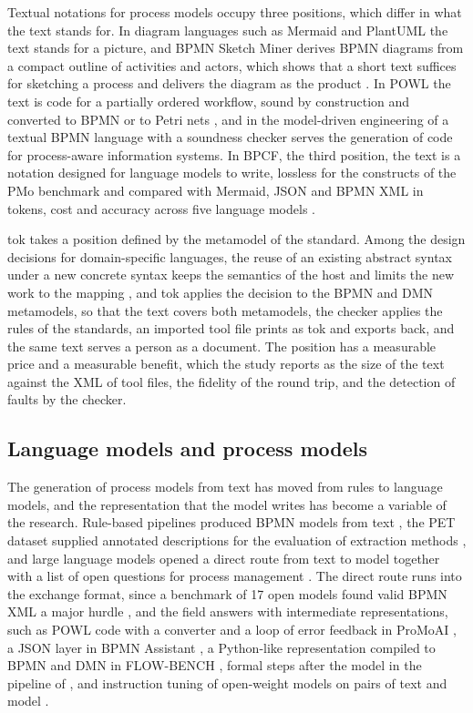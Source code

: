 \documentclass[11pt,a4paper]{article}
\begin{document}
Textual notations for process models occupy three positions, which differ in what the text stands for. In diagram languages such as Mermaid and PlantUML the text stands for a picture, and BPMN Sketch Miner derives BPMN diagrams from a compact outline of activities and actors, which shows that a short text suffices for sketching a process and delivers the diagram as the product \citep{Ivanchikj2020}. In POWL the text is code for a partially ordered workflow, sound by construction and converted to BPMN or to Petri nets \citep{Kourani2023powl}, and in the model-driven engineering of \citet{Drave2022mde} a textual BPMN language with a soundness checker serves the generation of code for process-aware information systems. In BPCF, the third position, the text is a notation designed for language models to write, lossless for the constructs of the PMo benchmark and compared with Mermaid, JSON and BPMN XML in tokens, cost and accuracy across five language models \citep{Agrawal2026bpcf}.

tok takes a position defined by the metamodel of the standard. Among the design decisions for domain-specific languages, the reuse of an existing abstract syntax under a new concrete syntax keeps the semantics of the host and limits the new work to the mapping \citep{Mernik2005}, and tok applies the decision to the BPMN and DMN metamodels, so that the text covers both metamodels, the checker applies the rules of the standards, an imported tool file prints as tok and exports back, and the same text serves a person as a document. The position has a measurable price and a measurable benefit, which the study reports as the size of the text against the XML of tool files, the fidelity of the round trip, and the detection of faults by the checker.

\subsection{Language models and process models}

The generation of process models from text has moved from rules to language models, and the representation that the model writes has become a variable of the research. Rule-based pipelines produced BPMN models from text \citep{Friedrich2011}, the PET dataset supplied annotated descriptions for the evaluation of extraction methods \citep{Bellan2022EDOC,Bellan2023PET}, and large language models opened a direct route from text to model together with a list of open questions for process management \citep{Vidgof2023llm}. The direct route runs into the exchange format, since a benchmark of 17 open models found valid BPMN XML a major hurdle \citep{Lauer2026competences}, and the field answers with intermediate representations, such as POWL code with a converter and a loop of error feedback in ProMoAI \citep{Kourani2024,Kourani2026}, a JSON layer in BPMN Assistant \citep{Licardo2026assistant}, a Python-like representation compiled to BPMN and DMN in FLOW-BENCH \citep{Duesterwald2025flowbench}, formal steps after the model in the pipeline of \citet{Nivon2025generation}, and instruction tuning of open-weight models on pairs of text and model \citep{Celikmasat2025instruction}.
\end{document}

